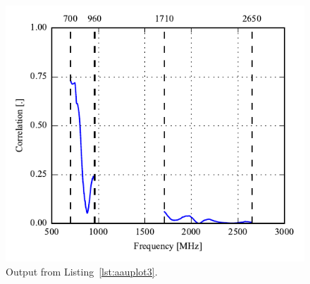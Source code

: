 \begin{figure}[htbp]
    \centering
    \includegraphics{sec/post_processing/examples_aauplot/ex3_correlation}
    \caption{Output from Listing~\ref{lst:aauplot3}.}
    \label{fig:aauplot_ex3}
\end{figure}

